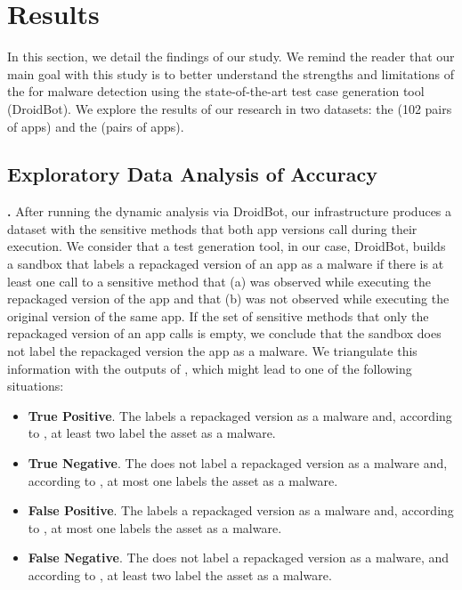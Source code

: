 \section{Results}\label{sec:results}


In this section, we detail the findings of our study.  We remind the reader that our main goal with this study is to
better understand the strengths and limitations of the \mas for malware detection using the state-of-the-art
test case generation tool (DroidBot). We explore
the results of our research in two datasets: the \sds (102 pairs of apps) and the
\cds (\apps pairs of apps).


\subsection{Exploratory Data Analysis of Accuracy}


{\bf \sds.}
After running the dynamic analysis via DroidBot, our infrastructure produces
a dataset with the sensitive methods that both app versions call during their execution. We consider that a test
generation tool, in our case, DroidBot, builds a sandbox that labels a repackaged version
of an app as a malware if there is at least one call to a sensitive method that (a) was observed
while executing the repackaged version of the app and that (b) was not observed while
executing the original version of the same app. 
If the set of sensitive methods that only the repackaged version of an app calls is empty,
we conclude that the sandbox does not label the repackaged version the app as a malware. We triangulate
this information with the outputs of \vt, which might lead to one of the following
situations:

\begin{itemize}
\item {\bf True Positive}. The \mas labels a repackaged version as a malware and, according to
  \vt, at least two \ses label the asset as a malware.
  
\item {\bf True Negative}. The \mas does not label a repackaged version as a malware and,
  according to \vt, at most one \se labels the asset as a malware. 

\item {\bf False Positive}. The \mas labels a repackaged version as a malware and, according to
  \vt, at most one \se labels the asset as a malware.

\item {\bf False Negative}. The \mas does not label a repackaged version as a malware, and
  according to \vt, at least two \ses label the asset as a malware.
\end{itemize}




